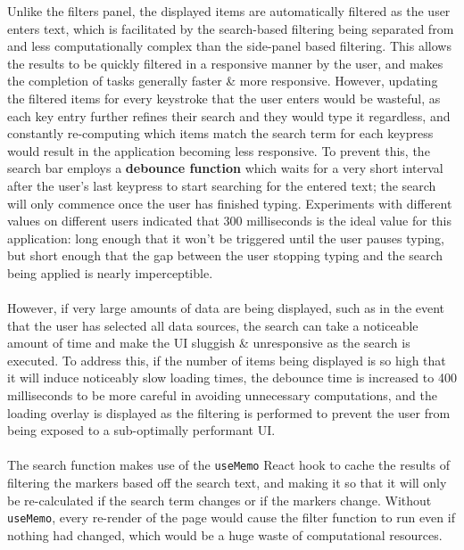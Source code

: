 \documentclass[a4paper,11pt]{report}
\begin{document}
Unlike the filters panel, the displayed items are automatically filtered as the user enters text, which is facilitated by the search-based filtering being separated from and less computationally complex than the side-panel based filtering.
This allows the results to be quickly filtered in a responsive manner by the user, and makes the completion of tasks generally faster \& more responsive.
However, updating the filtered items for every keystroke that the user enters would be wasteful, as each key entry further refines their search and they would type it regardless, and constantly re-computing which items match the search term for each keypress would result in the application becoming less responsive.
To prevent this, the search bar employs a \textbf{debounce function}\supercite{debounce} which waits for a very short interval after the user's last keypress to start searching for the entered text;
the search will only commence once the user has finished typing.
Experiments with different values on different users indicated that 300 milliseconds is the ideal value for this application:
long enough that it won't be triggered until the user pauses typing, but short enough that the gap between the user stopping typing and the search being applied is nearly imperceptible.
\\\\
However, if very large amounts of data are being displayed, such as in the event that the user has selected all data sources, the search can take a noticeable amount of time and make the UI sluggish \& unresponsive as the search is executed.
To address this, if the number of items being displayed is so high that it will induce noticeably slow loading times, the debounce time is increased to 400 milliseconds to be more careful in avoiding unnecessary computations, and the loading overlay is displayed as the filtering is performed to prevent the user from being exposed to a sub-optimally performant UI.
\\\\
The search function makes use of the \texttt{useMemo}\supercite{usememo} React hook to cache the results of filtering the markers based off the search text, and making it so that it will only be re-calculated if the search term changes or if the markers change.
Without \texttt{useMemo}, every re-render of the page would cause the filter function to run even if nothing had changed, which would be a huge waste of computational resources.
\end{document}

